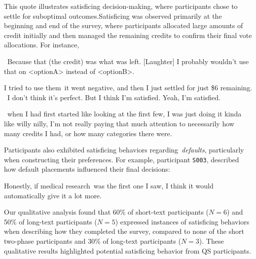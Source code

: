 This quote illustrates satisficing decision-making, where participants chose to settle for suboptimal outcomes.Satisficing was observed primarily at the beginning and end of the survey, where participants allocated large amounts of credit initially and then managed the remaining credits to confirm their final vote allocations. For instance, 

\begin{displayquote}
    ~\bracketellipsis Because that (the credit) was what was left. [Laughter] I probably wouldn't use that on <optionA> instead of <optionB>.~\bracketellipsis \hfill{}

    I tried to use them~\bracketellipsis it went negative, and then I just settled for just \$6 remaining. ~\bracketellipsis I don't think it's perfect. But I think I'm satisfied. Yeah, I'm satisfied.  \hfill{}

    ~\bracketellipsis when I had first started like looking at the first few, I was just doing it kinda like willy nilly, I'm not really paying that much attention to necessarily how many credits I had, or how many categories there were. \hfill{}
\end{displayquote}

Participants also exhibited satisficing behaviors regarding~\textit{defaults}, particularly when constructing their preferences. For example, participant \texttt{S003}, described how default placements influenced their final decisions:

\begin{displayquote}
    Honestly, if medical research~\bracketellipsis was the first one I saw, I think it would automatically give it a lot more. \hfill{}
\end{displayquote}

Our qualitative analysis found that 60\% of short-text participants ($N=6$) and 50\% of long-text participants ($N=5$) expressed instances of satisficing behaviors when describing how they completed the survey, compared to none of the short two-phase participants and 30\% of long-text participants ($N=3$). These qualitative results highlighted potential satisficing behavior from QS participants.
















